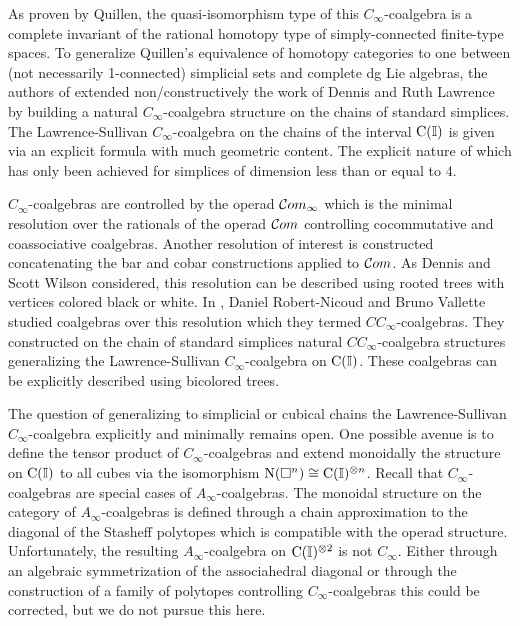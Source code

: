 As proven by Quillen, the quasi-isomorphism type of this $C_\infty$-coalgebra is a complete invariant of the rational homotopy type of simply-connected finite-type spaces.
To generalize Quillen's equivalence of homotopy categories to one between (not necessarily 1-connected) simplicial sets and complete dg Lie algebras, the authors of \cite{buijs2020liemodels} extended non\-/constructively the work of Dennis and Ruth Lawrence \cite{lawrence2014interval} by building a natural $C_\infty$-coalgebra structure on the chains of standard simplices.
The Lawrence-Sullivan $C_\infty$-coalgebra on the chains of the interval $\operatorname{C}(\mathbb{I})$ is given via an explicit formula with much geometric content.
The explicit nature of which has only been achieved for simplices of dimension less than or equal to $4$.

$C_\infty$-coalgebras are controlled by the operad $\mathcal{C}om_\infty$ which is the minimal resolution over the rationals of the operad $\mathcal{C}om$ controlling cocommutative and coassociative coalgebras.
Another resolution of interest is constructed concatenating the bar and cobar constructions applied to $\mathcal{C}om$.
As Dennis and Scott Wilson considered, this resolution can be described using rooted trees with vertices colored black or white.
In \cite{bibid}, Daniel Robert-Nicoud and Bruno Vallette studied coalgebras over this resolution which they termed $CC_\infty$-coalgebras.
They constructed on the chain of standard simplices natural $CC_\infty$-coalgebra structures generalizing the Lawrence-Sullivan $C_\infty$-coalgebra on $\operatorname{C}(\mathbb{I})$. These coalgebras can be explicitly described using bicolored trees.

The question of generalizing to simplicial or cubical chains the Lawrence-Sullivan $C_\infty$-coalgebra explicitly and minimally remains open.
One possible avenue is to define the tensor product of $C_\infty$-coalgebras and extend monoidally the structure on $\operatorname{C}(\mathbb{I})$ to all cubes via the isomorphism $\operatorname{N}(\square^n) \cong \operatorname{C}(\mathbb{I})^{\otimes n}$.
Recall that $C_\infty$-coalgebras are special cases of $A_\infty$-coalgebras.
The monoidal structure on the category of $A_\infty$-coalgebras is defined through a chain approximation to the diagonal of the Stasheff polytopes which is compatible with the operad structure.
Unfortunately, the resulting $A_\infty$-coalgebra on $\operatorname{C}(\mathbb{I})^{\otimes 2}$ is not $C_\infty$.
Either through an algebraic symmetrization of the associahedral diagonal or through the construction of a family of polytopes controlling $C_\infty$-coalgebras this could be corrected, but we do not pursue this here.

